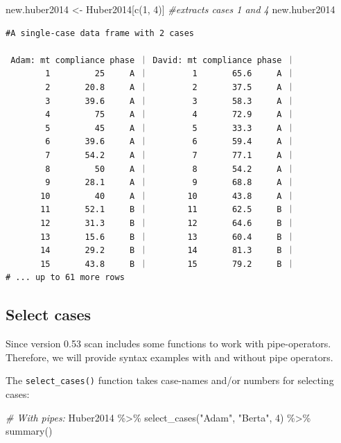 \documentclass[
]{book}
\newenvironment{Shaded}{\begin{snugshade}}{\end{snugshade}}
\newcommand{\CommentTok}[1]{\textcolor[rgb]{0.56,0.35,0.01}{\textit{#1}}}
\newcommand{\DecValTok}[1]{\textcolor[rgb]{0.00,0.00,0.81}{#1}}
\newcommand{\FunctionTok}[1]{\textcolor[rgb]{0.00,0.00,0.00}{#1}}
\newcommand{\NormalTok}[1]{#1}
\newcommand{\OtherTok}[1]{\textcolor[rgb]{0.56,0.35,0.01}{#1}}
\newcommand{\SpecialCharTok}[1]{\textcolor[rgb]{0.00,0.00,0.00}{#1}}
\newcommand{\StringTok}[1]{\textcolor[rgb]{0.31,0.60,0.02}{#1}}
\begin{document}
\begin{Shaded}
\begin{Highlighting}[]
\NormalTok{new.huber2014 }\OtherTok{\textless{}{-}}\NormalTok{ Huber2014[}\FunctionTok{c}\NormalTok{(}\DecValTok{1}\NormalTok{, }\DecValTok{4}\NormalTok{)] }\CommentTok{\#extracts cases 1 and 4}
\NormalTok{new.huber2014}
\end{Highlighting}
\end{Shaded}

\begin{verbatim}
#A single-case data frame with 2 cases

 Adam: mt compliance phase ｜ David: mt compliance phase ｜
        1         25     A ｜         1       65.6     A ｜
        2       20.8     A ｜         2       37.5     A ｜
        3       39.6     A ｜         3       58.3     A ｜
        4         75     A ｜         4       72.9     A ｜
        5         45     A ｜         5       33.3     A ｜
        6       39.6     A ｜         6       59.4     A ｜
        7       54.2     A ｜         7       77.1     A ｜
        8         50     A ｜         8       54.2     A ｜
        9       28.1     A ｜         9       68.8     A ｜
       10         40     A ｜        10       43.8     A ｜
       11       52.1     B ｜        11       62.5     B ｜
       12       31.3     B ｜        12       64.6     B ｜
       13       15.6     B ｜        13       60.4     B ｜
       14       29.2     B ｜        14       81.3     B ｜
       15       43.8     B ｜        15       79.2     B ｜
# ... up to 61 more rows
\end{verbatim}

\hypertarget{select-cases}{%
\subsection{Select cases}\label{select-cases}}

Since version 0.53 scan includes some functions to work with pipe-operators. Therefore, we will provide syntax examples with and without pipe operators.

The \texttt{select\_cases()} function takes case-names and/or numbers for selecting cases:

\begin{Shaded}
\begin{Highlighting}[]
\CommentTok{\# With pipes:}
\NormalTok{Huber2014 }\SpecialCharTok{\%\textgreater{}\%}
  \FunctionTok{select\_cases}\NormalTok{(}\StringTok{"Adam"}\NormalTok{, }\StringTok{"Berta"}\NormalTok{, }\DecValTok{4}\NormalTok{) }\SpecialCharTok{\%\textgreater{}\%}
  \FunctionTok{summary}\NormalTok{()}
\end{Highlighting}
\end{Shaded}
\end{document}
